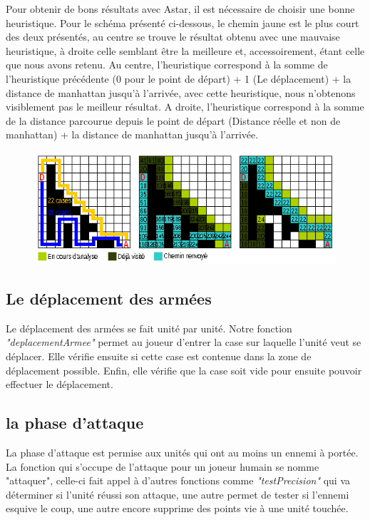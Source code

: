 \documentclass{article}
\begin{document}
	Pour obtenir de bons résultats avec Astar, il est nécessaire de choisir une bonne heuristique. Pour le schéma présenté ci-dessous, le chemin jaune est le plus court des deux présentés, au centre se trouve le résultat obtenu avec une mauvaise heuristique, à droite celle semblant être la meilleure et, accessoirement, étant celle que nous avons retenu. Au centre, l'heuristique correspond à la somme de l'heuristique précédente (0 pour le point de départ) + 1 (Le déplacement) + la distance de manhattan jusqu'à l'arrivée, avec cette heuristique, nous n'obtenons visiblement pas le meilleur résultat. A droite, l'heuristique correspond à la somme de la distance parcourue depuis le point de départ (Distance réelle et non de manhattan) + la distance de manhattan jusqu'à l'arrivée.

  \begin{figure}[h]
	\center
	\includegraphics[scale=1.2]{../images/Astar03.png}
  \end{figure}

 
 \subsection{Le déplacement des armées}
 Le déplacement des armées se fait unité par unité. Notre fonction \textit{"deplacementArmee"} permet au joueur d'entrer la case sur laquelle l'unité veut se déplacer. Elle vérifie ensuite si cette case est contenue dans la zone de déplacement possible. Enfin, elle vérifie que la case soit vide pour ensuite pouvoir effectuer le déplacement.
 \subsection{la phase d'attaque}
 La phase d'attaque est permise aux unités qui ont au moins un ennemi à portée. La fonction qui s'occupe de l'attaque pour un joueur humain se nomme "attaquer", celle-ci fait appel à d'autres fonctions comme \textit{"testPrecision"} qui va déterminer si l'unité réussi son attaque, une autre permet de tester si l'ennemi esquive le coup, une autre encore supprime des points vie à une unité touchée.
 
\end{document}
